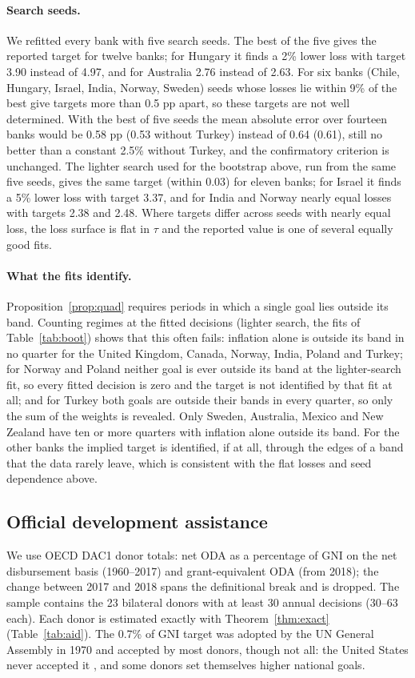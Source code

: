 \documentclass[11pt,a4paper]{article}
\theoremstyle{remark}\newtheorem{remark}{Remark}
\begin{document}
\paragraph{Search seeds.} We refitted every bank with five search seeds. The best of the five gives the reported target for twelve banks; for Hungary it finds a 2\% lower loss with target 3.90 instead of 4.97, and for Australia 2.76 instead of 2.63. For six banks (Chile, Hungary, Israel, India, Norway, Sweden) seeds whose losses lie within 9\% of the best give targets more than 0.5 pp apart, so these targets are not well determined. With the best of five seeds the mean absolute error over fourteen banks would be 0.58 pp (0.53 without Turkey) instead of 0.64 (0.61), still no better than a constant 2.5\% without Turkey, and the confirmatory criterion is unchanged. The lighter search used for the bootstrap above, run from the same five seeds, gives the same target (within 0.03) for eleven banks; for Israel it finds a 5\% lower loss with target 3.37, and for India and Norway nearly equal losses with targets 2.38 and 2.48. Where targets differ across seeds with nearly equal loss, the loss surface is flat in $\tau$ and the reported value is one of several equally good fits.

\paragraph{What the fits identify.} Proposition~\ref{prop:quad} requires periods in which a single goal lies outside its band. Counting regimes at the fitted decisions (lighter search, the fits of Table~\ref{tab:boot}) shows that this often fails: inflation alone is outside its band in no quarter for the United Kingdom, Canada, Norway, India, Poland and Turkey; for Norway and Poland neither goal is ever outside its band at the lighter-search fit, so every fitted decision is zero and the target is not identified by that fit at all; and for Turkey both goals are outside their bands in every quarter, so only the sum of the weights is revealed. Only Sweden, Australia, Mexico and New Zealand have ten or more quarters with inflation alone outside its band. For the other banks the implied target is identified, if at all, through the edges of a band that the data rarely leave, which is consistent with the flat losses and seed dependence above.

\subsection{Official development assistance}\label{sec:aid}
We use OECD DAC1 donor totals: net ODA as a percentage of GNI on the net disbursement basis (1960--2017) and grant-equivalent ODA (from 2018); the change between 2017 and 2018 spans the definitional break and is dropped. The sample contains the 23 bilateral donors with at least 30 annual decisions (30--63 each). Each donor is estimated exactly with Theorem~\ref{thm:exact} (Table~\ref{tab:aid}). The 0.7\% of GNI target was adopted by the UN General Assembly in 1970 and accepted by most donors, though not all: the United States never accepted it \citep{clemens2007}, and some donors set themselves higher national goals.
\end{document}
